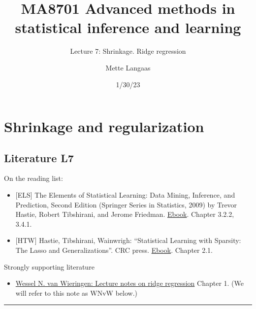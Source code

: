 \documentclass[
  letterpaper,
  DIV=11,
  numbers=noendperiod]{scrartcl}
\title{MA8701 Advanced methods in statistical inference and learning}
\subtitle{Lecture 7: Shrinkage. Ridge regression}
\author{Mette Langaas}
\date{1/30/23}
\providecommand{\tightlist}{%
  \setlength{\itemsep}{0pt}\setlength{\parskip}{0pt}}\usepackage{longtable,booktabs,array}
\renewcommand*\contentsname{Table of contents}
\newcommand\contentsname{Table of contents}
\begin{document}
\maketitle
\ifdefined\Shaded\renewenvironment{Shaded}{\begin{tcolorbox}[enhanced, frame hidden, interior hidden, borderline west={3pt}{0pt}{shadecolor}, breakable, sharp corners, boxrule=0pt]}{\end{tcolorbox}}\fi

\renewcommand*\contentsname{Table of contents}
{
\hypersetup{linkcolor=}
\setcounter{tocdepth}{3}
\tableofcontents
}
\hypertarget{shrinkage-and-regularization}{%
\section{Shrinkage and
regularization}\label{shrinkage-and-regularization}}

\hypertarget{literature-l7}{%
\subsection{Literature L7}\label{literature-l7}}

On the reading list:

\begin{itemize}
\item
  {[}ELS{]} The Elements of Statistical Learning: Data Mining,
  Inference, and Prediction, Second Edition (Springer Series in
  Statistics, 2009) by Trevor Hastie, Robert Tibshirani, and Jerome
  Friedman.
  \href{https://web.stanford.edu/~hastie/Papers/ESLII.pdf}{Ebook}.
  Chapter 3.2.2, 3.4.1.
\item
  {[}HTW{]} Hastie, Tibshirani, Wainwrigh: ``Statistical Learning with
  Sparsity: The Lasso and Generalizations''. CRC press.
  \href{https://trevorhastie.github.io/}{Ebook}. Chapter 2.1.
\end{itemize}

Strongly supporting literature

\begin{itemize}
\tightlist
\item
  \href{https://arxiv.org/pdf/1509.09169v7.pdf}{Wessel N. van Wieringen:
  Lecture notes on ridge regression} Chapter 1. (We will refer to this
  note as WNvW below.)
\end{itemize}

\begin{center}\rule{0.5\linewidth}{0.5pt}\end{center}
\end{document}

